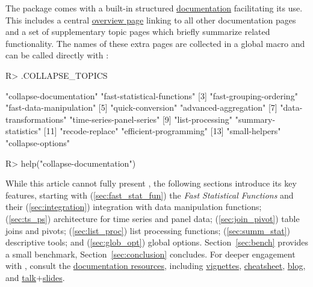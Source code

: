 \documentclass[nojss]{jss} %
\begin{document}
The package comes with a built-in structured \href{https://sebkrantz.github.io/collapse/reference/index.html}{documentation} facilitating its use. This includes a central \href{https://sebkrantz.github.io/collapse/reference/collapse-documentation.html}{overview page} linking to all other documentation pages and a set of supplementary topic pages which briefly summarize related functionality. The names of these extra pages are collected in a global macro  and can be called directly with :
%
\begin{Schunk}
\begin{Sinput}
R> .COLLAPSE_TOPICS
\end{Sinput}
\begin{Soutput}
 [1] "collapse-documentation"     "fast-statistical-functions"
 [3] "fast-grouping-ordering"     "fast-data-manipulation"    
 [5] "quick-conversion"           "advanced-aggregation"      
 [7] "data-transformations"       "time-series-panel-series"  
 [9] "list-processing"            "summary-statistics"        
[11] "recode-replace"             "efficient-programming"     
[13] "small-helpers"              "collapse-options"          
\end{Soutput}
\begin{Sinput}
R> help("collapse-documentation")
\end{Sinput}
\end{Schunk}
%
While this article cannot fully present , the following sections introduce its key features, starting with (\ref{sec:fast_stat_fun}) the \emph{Fast Statistical Functions} and their (\ref{sec:integration}) integration with data manipulation functions; (\ref{sec:ts_ps}) architecture for time series and panel data; (\ref{sec:join_pivot}) table joins and pivots; (\ref{sec:list_proc}) list processing functions; (\ref{sec:summ_stat}) descriptive tools; and (\ref{sec:glob_opt}) global options. Section~\ref{sec:bench} provides a small benchmark, Section~\ref{sec:conclusion} concludes. For deeper engagement with , consult the \href{https://sebkrantz.github.io/collapse/articles/collapse_documentation.html}{documentation resources}, including \href{https://sebkrantz.github.io/collapse/articles/index.html}{vignettes}, \href{https://raw.githubusercontent.com/SebKrantz/collapse/master/misc/collapse\%20cheat\%20sheet/collapse_cheat_sheet.pdf}{cheatsheet}, \href{https://sebkrantz.github.io/Rblog/}{blog}, and \href{https://www.youtube.com/watch?v=OwWT1-dSEts}{talk}$+$\href{https://raw.githubusercontent.com/SebKrantz/collapse/master/misc/useR2022\%20presentation/collapse_useR2022_final.pdf}{slides}.
%
\end{document}
